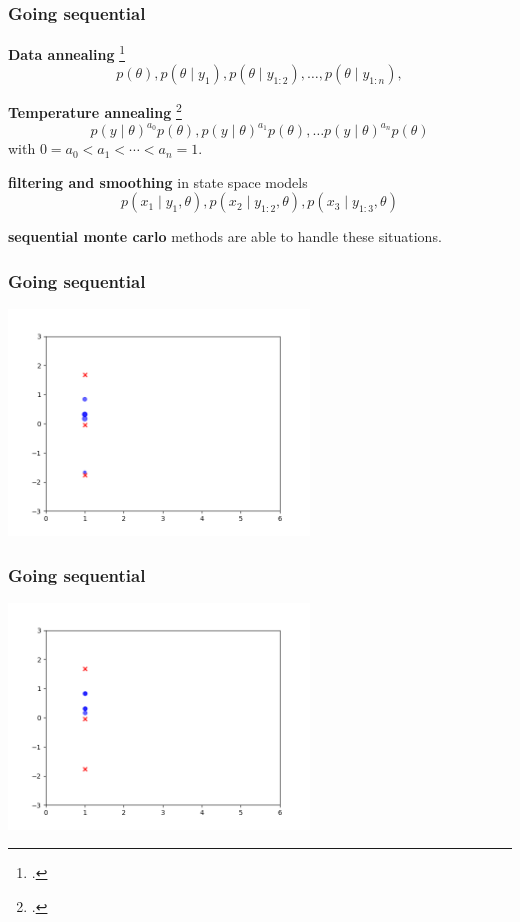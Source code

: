 \documentclass{beamer}
\begin{document}
\begin{frame}[fragile]
\frametitle{Going sequential}

{\bf Data annealing} \footcite{Chopin}
\[
p(\theta), p(\theta \mid y_1), p(\theta \mid y_{1:2}), \ldots, p(\theta \mid y_{1:n}),
\]

{\bf Temperature annealing} \footcite{Neal}
\[
p(y \mid \theta)^{a_0} p(\theta), p(y \mid \theta)^{a_1} p(\theta),  \ldots p(y \mid \theta)^{a_n} p(\theta)
\]
with $0 = a_0 < a_1 < \cdots < a_n = 1$. 
\newline


{\bf filtering and smoothing} in state space models
\[
p(x_1 \mid y_1, \theta), p(x_{2} \mid y_{1:2}, \theta), p(x_{3} \mid y_{1:3}, \theta)
\]

{\bf sequential monte carlo} methods are able to handle these situations.
\end{frame}


\begin{frame}[fragile]
\frametitle{Going sequential}

\begin{center}
\includegraphics[width=80mm]{pfilt_anim_1.png}
\end{center}

\end{frame}

\begin{frame}[fragile]
\frametitle{Going sequential}

\begin{center}
\includegraphics[width=80mm]{pfilt_anim_2.png}
\end{center}

\end{frame}
\end{document}
